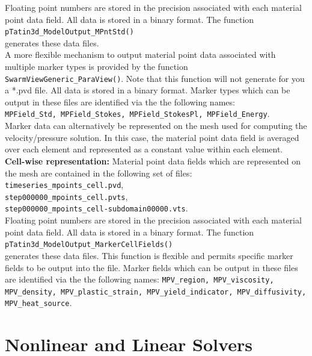 \documentclass[paper=a4, fontsize=11pt,twoside]{scrartcl}
\newcommand{\unix}[1]{\texttt{\footnotesize #1}}
\begin{document}
{{Floating point numbers are stored in the precision associated with each material point data field. All data is stored in a binary format. The function \\
\unix{pTatin3d\_ModelOutput\_MPntStd()} \\
generates these data files.
\\[8pt]
A more flexible mechanism to output material point data associated with multiple marker types is provided by the function \unix{SwarmViewGeneric\_ParaView()}. Note that this function will not generate for you a *.pvd file.  All data is stored in a binary format. Marker types which can be output in these files are identified via the the following names: \\
\unix{MPField\_Std, MPField\_Stokes, MPField\_StokesPl, MPField\_Energy}.
\\[8pt]
Marker data can alternatively be represented on the mesh used for computing the velocity/pressure solution. 
In this case, the material point data field is averaged over each element and represented as a constant value within each element.
\\[8pt]
{\bf Cell-wise representation:} Material point data fields which are represented on the mesh are contained in the following set of files:\\
\unix{timeseries\_mpoints\_cell.pvd}, \\
\unix{step000000\_mpoints\_cell.pvts}, \\
\unix{step000000\_mpoints\_cell-subdomain00000.vts}. \\
Floating point numbers are stored in the precision associated with each material point data field. All data is stored in a binary format.
The function \\
	\unix{pTatin3d\_ModelOutput\_MarkerCellFields()} \\
generates these data files. This function is flexible and permits specific marker fields to be output into the file. Marker fields which can be output in these files are identified via the the following names:
\unix{MPV\_region, MPV\_viscosity, MPV\_density, MPV\_plastic\_strain, MPV\_yield\_indicator, MPV\_diffusivity, MPV\_heat\_source}.

\newpage
\section{Nonlinear and Linear Solvers}

}}
\end{document}
